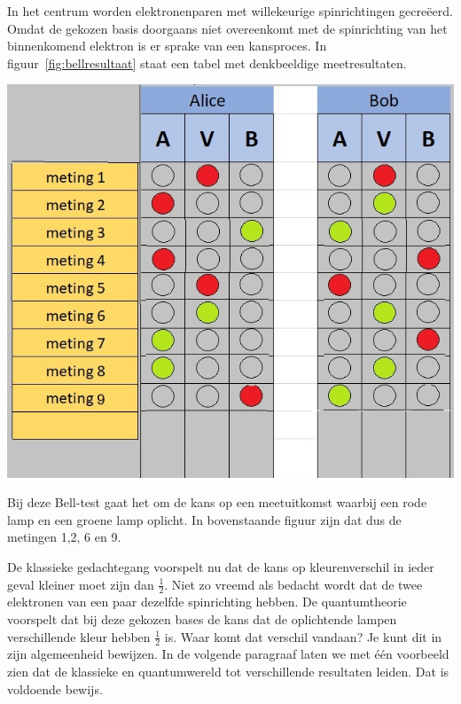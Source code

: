 \documentclass[../../main.tex]{subfiles}
\begin{document}
In het centrum worden elektronenparen met willekeurige spinrichtingen gecreëerd. Omdat de gekozen basis doorgaans niet  overeenkomt met de spinrichting van het binnenkomend elektron is er sprake van een kansproces. In figuur~\ref{fig:bellresultaat} staat een tabel met denkbeeldige meetresultaten. 

\begin{flushleft}
\begin{minipage}{.45\textwidth}
\includegraphics[width=\textwidth]{./img/bellresultaat.png}
\end{minipage}%
\hfill
\begin{minipage}{.5\textwidth}
\end{minipage}%
\end{flushleft}

Bij deze Bell-test gaat het om de kans  op een meetuitkomst waarbij een rode lamp en een  groene lamp oplicht.  In bovenstaande figuur zijn dat dus de metingen 1,2, 6 en 9. 

De klassieke gedachtegang voorspelt nu dat de kans op kleurenverschil in ieder geval kleiner moet zijn dan $\tfrac{1}{2}$. Niet zo vreemd als bedacht wordt dat de twee elektronen van een paar dezelfde spinrichting hebben. De quantumtheorie voorspelt dat bij deze gekozen bases de kans dat de oplichtende lampen verschillende kleur hebben $\tfrac{1}{2}$ is. Waar komt dat verschil vandaan? Je kunt dit in zijn algemeenheid bewijzen. In de volgende paragraaf laten we met \'e\'en voorbeeld zien dat de klassieke en quantumwereld tot verschillende resultaten leiden. Dat is voldoende bewijs. 
\end{document}
